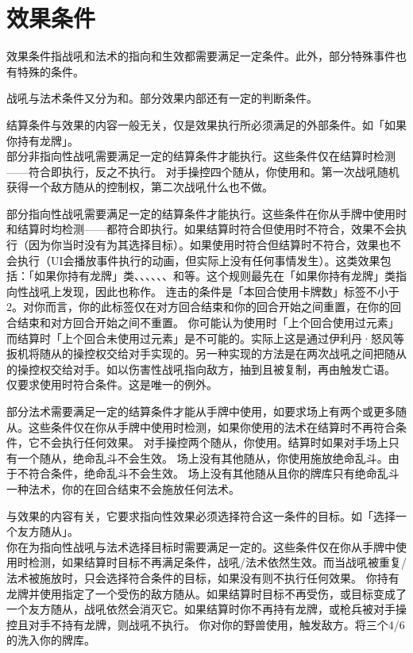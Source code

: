 \section{效果条件}
\label{effect-cond}

效果条件指战吼和法术的指向和生效都需要满足一定条件。此外，部分特殊事件也有特殊的条件。

战吼与法术条件又分为和。部分效果内部还有一定的判断条件。

结算条件与效果的内容一般无关，仅是效果执行所必须满足的外部条件。如「如果你持有龙牌」。\\
部分非指向性战吼需要满足一定的结算条件才能执行。这些条件仅在结算时检测——符合即执行，反之不执行。
\example 对手操控四个随从，你使用和。第一次战吼随机获得一个敌方随从的控制权，第二次战吼什么也不做。

部分指向性战吼需要满足一定的结算条件才能执行。这些条件在你从手牌中使用时和结算时均检测——都符合即执行。如果结算时符合但使用时不符合，效果不会执行（因为你当时没有为其选择目标）。如果使用时符合但结算时不符合，效果也不会执行（UI会播放事件执行的动画，但实际上没有任何事情发生）。这类效果包括：「如果你持有龙牌」类、、、、、、和等。这个规则最先在「如果你持有龙牌」类指向性战吼上发现，因此也称作。
\notice 连击的条件是「本回合使用卡牌数」标签不小于2。对你而言，你的此标签仅在对方回合结束和你的回合开始之间重置，在你的回合结束和对方回合开始之间不重置。
\notice 你可能认为使用时「上个回合使用过元素」而结算时「上个回合未使用过元素」是不可能的。实际上这是通过伊利丹·怒风等扳机将随从的操控权交给对手实现的。另一种实现的方法是在两次战吼之间把随从的操控权交给对手。如以伤害性战吼指向敌方，抽到且被复制，再由触发亡语。
\exception {}仅要求使用时符合条件。这是唯一的例外。

部分法术需要满足一定的结算条件才能从手牌中使用，如要求场上有两个或更多随从。这些条件仅在你从手牌中使用时检测，如果你使用的法术在结算时不再符合条件，它不会执行任何效果。
\example 对手操控两个随从，你使用。结算时如果对手场上只有一个随从，绝命乱斗不会生效。
\example 场上没有其他随从，你使用施放绝命乱斗。由于不符合条件，绝命乱斗不会生效。
\example 场上没有其他随从且你的牌库只有绝命乱斗一种法术，你的在回合结束不会施放任何法术。

与效果的内容有关，它要求指向性效果必须选择符合这一条件的目标。如「选择一个友方随从」。\\
你在为指向性战吼与法术选择目标时需要满足一定的。这些条件仅在你从手牌中使用时检测，如果结算时目标不再满足条件，战吼/法术依然生效。而当战吼被重复/法术被施放时，只会选择符合条件的目标，如果没有则不执行任何效果。
\example 你持有龙牌并使用指定了一个受伤的敌方随从。如果结算时目标不再受伤，或目标变成了一个友方随从，战吼依然会消灭它。如果结算时你不再持有龙牌，或枪兵被对手操控且对手不持有龙牌，则战吼不执行。
\example 你对你的野兽使用，触发敌方。将三个4/6的洗入你的牌库。

